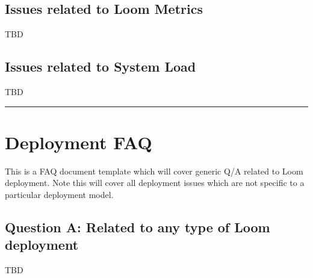 \documentclass[letterpaper,10pt,english]{sphinxmanual}
\begin{document}
\section{Issues related to Loom Metrics}
\label{\detokenize{loom_installation_guide:issues-related-to-loom-metrics}}
TBD


\section{Issues related to System Load}
\label{\detokenize{loom_installation_guide:issues-related-to-system-load}}
TBD


\bigskip\hrule\bigskip



\chapter{Deployment FAQ}
\label{\detokenize{loom_installation_guide:deployment-faq}}
This is a FAQ document template which will cover generic Q/A related to Loom deployment.  Note this will cover all deployment issues which are not specific to a particular deployment model.


\section{Question A: Related to any type of Loom deployment}
\label{\detokenize{loom_installation_guide:question-a-related-to-any-type-of-loom-deployment}}
TBD



\renewcommand{\indexname}{Index}
\printindex
\end{document}
